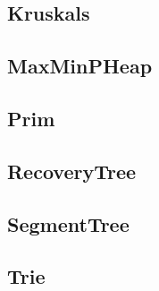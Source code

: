 \subsection{ Kruskals}
\raggedbottom
\hrulefill
\subsection{ MaxMinPHeap}
\raggedbottom
\hrulefill
\subsection{ Prim}
\raggedbottom
\hrulefill
\subsection{ RecoveryTree}
\raggedbottom
\hrulefill
\subsection{ SegmentTree}
\raggedbottom
\hrulefill
\subsection{ Trie}
\raggedbottom
\hrulefill

